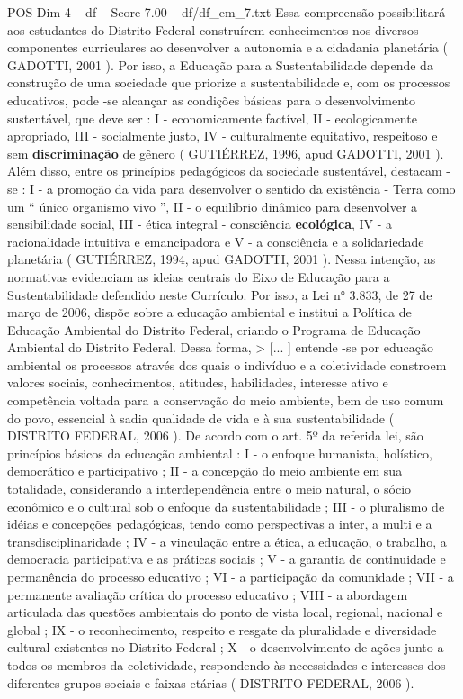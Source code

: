 \begin{textsample}{POS Dim 4 – df – Score 7.00 – df/df\_em\_7.txt}
Essa compreensão possibilitará aos estudantes do Distrito Federal construírem conhecimentos nos diversos componentes curriculares ao desenvolver a autonomia e a cidadania planetária ( GADOTTI, 2001 ).
Por isso, a Educação para a Sustentabilidade depende da construção de uma sociedade que priorize a sustentabilidade e, com os processos educativos, pode -se alcançar as condições básicas para o desenvolvimento sustentável, que deve ser : I - economicamente factível, II - ecologicamente apropriado, III - socialmente justo, IV - culturalmente equitativo, respeitoso e sem \textbf{discriminação} de gênero ( GUTIÉRREZ, 1996, apud GADOTTI, 2001 ).
Além disso, entre os princípios pedagógicos da sociedade sustentável, destacam -se : I - a promoção da vida para desenvolver o sentido da existência - Terra como um “ único organismo vivo ”, II - o equilíbrio dinâmico para desenvolver a sensibilidade social, III - ética integral - consciência \textbf{ecológica}, IV - a racionalidade intuitiva e emancipadora e V - a consciência e a solidariedade planetária ( GUTIÉRREZ, 1994, apud GADOTTI, 2001 ).
Nessa intenção, as normativas evidenciam as ideias centrais do Eixo de Educação para a Sustentabilidade defendido neste Currículo.
Por isso, a Lei n{\EmojiFont °} 3.833, de 27 de março de 2006, dispõe sobre a educação ambiental e institui a Política de Educação Ambiental do Distrito Federal, criando o Programa de Educação Ambiental do Distrito Federal.
Dessa forma, > [... ] entende -se por educação ambiental os processos através dos quais o indivíduo e a coletividade constroem valores sociais, conhecimentos, atitudes, habilidades, interesse ativo e competência voltada para a conservação do meio ambiente, bem de uso comum do povo, essencial à sadia qualidade de vida e à sua sustentabilidade ( DISTRITO FEDERAL, 2006 ).
De acordo com o art. 5º da referida lei, são princípios básicos da educação ambiental : I - o enfoque humanista, holístico, democrático e participativo ; II - a concepção do meio ambiente em sua totalidade, considerando a interdependência entre o meio natural, o sócio econômico e o cultural sob o enfoque da sustentabilidade ; III - o pluralismo de idéias e concepções pedagógicas, tendo como perspectivas a inter, a multi e a transdisciplinaridade ; IV - a vinculação entre a ética, a educação, o trabalho, a democracia participativa e as práticas sociais ; V - a garantia de continuidade e permanência do processo educativo ; VI - a participação da comunidade ; VII - a permanente avaliação crítica do processo educativo ; VIII - a abordagem articulada das questões ambientais do ponto de vista local, regional, nacional e global ; IX - o reconhecimento, respeito e resgate da pluralidade e diversidade cultural existentes no Distrito Federal ; X - o desenvolvimento de ações junto a todos os membros da coletividade, respondendo às necessidades e interesses dos diferentes grupos sociais e faixas etárias ( DISTRITO FEDERAL, 2006 ).

\end{textsample}
